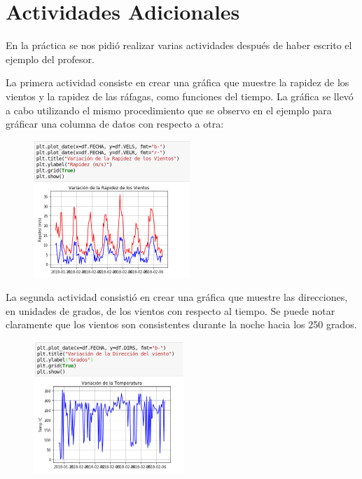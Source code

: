 \documentclass{article}
\begin{document}
\section{Actividades Adicionales}

En la práctica se nos pidió realizar varias actividades después de haber escrito el ejemplo del profesor.

La primera actividad consiste en crear una gráfica que muestre la rapidez de los vientos y la rapidez de las ráfagas, como funciones del tiempo. La gráfica se llevó a cabo utilizando el mismo procedimiento que se observo en el ejemplo para gráficar una columna de datos con respecto a otra:
\begin{figure}[ht]
\centering
\includegraphics[height=195px,width=223px]{15thcell.png}
\end{figure}

\newpage
 
La segunda actividad consistió en crear una gráfica que muestre las direcciones, en unidades de grados, de los vientos con respecto al tiempo. Se puede notar claramente que los vientos son consistentes durante la noche hacia los 250 grados.
\begin{figure}[h]
\centering
\includegraphics[height=188px,width=213px]{16thcell.png}
\end{figure}

\newpage
\end{document}
